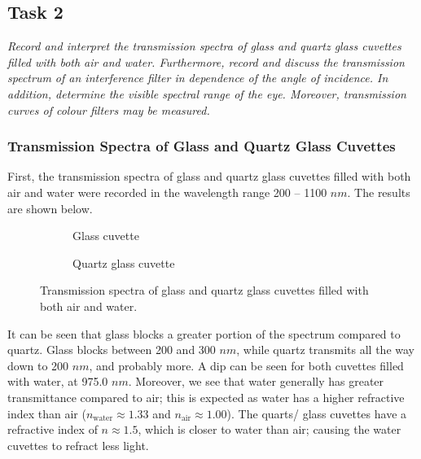 \documentclass{article}
\begin{document}
\pagebreak{}

\subsection{Task 2}

\textit{Record and interpret the transmission spectra of glass and quartz glass cuvettes
filled with both air and water. Furthermore, record and discuss the transmission
spectrum of an interference filter in dependence of the angle of incidence. In addition,
determine the visible spectral range of the eye. Moreover, transmission curves of
colour filters may be measured.}

\subsubsection{Transmission Spectra of Glass and Quartz Glass Cuvettes}

First, the transmission spectra of glass and quartz glass cuvettes filled with both air and water were recorded in the wavelength range 200 -- 1100 $nm$. The results are shown below.

\begin{figure}[h!]
	\centering
	\begin{subfigure}{0.45\textwidth}
		\centering
		\scalebox{0.50}{}
		\caption{Glass cuvette}
		\label{fig:Glass}
	\end{subfigure}
	\hspace{0.5cm}
	\begin{subfigure}{0.45\textwidth}
		\centering
		\scalebox{0.50}{}
		\caption{Quartz glass cuvette}
		\label{fig:Quartz}
	\end{subfigure}
	\caption{Transmission spectra of glass and quartz glass cuvettes filled with both air and water.}
	\label{fig:GlassQuartz}
\end{figure}

It can be seen that glass blocks a greater portion of the spectrum compared to quartz. Glass blocks between 200 and 300 $nm$, while quartz transmits all the way down to 200 $nm$, and probably more.
A dip can be seen for both cuvettes filled with water, at 975.0 $nm$. Moreover, we see that water generally has greater transmittance compared to air; this is expected as water has a higher refractive index than air ($n_{\text{water}} \approx 1.33$ and $n_{\text{air}} \approx 1.00$). 
The quarts/ glass cuvettes have a refractive index of $n \approx 1.5$, which is closer to water than air; causing the water cuvettes to refract less light.
\end{document}
